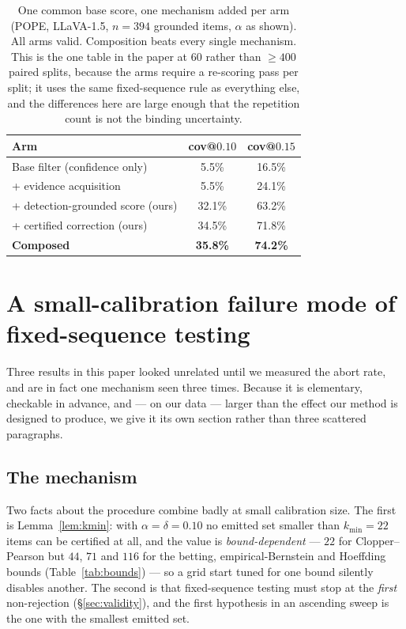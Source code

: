 \documentclass[review,number,doubleblind]{elsarticle}
\theoremstyle{plain}
\theoremstyle{definition}
\theoremstyle{remark}
\begin{document}
\begin{table}[t]
\centering
\caption{One common base score, one mechanism added per arm (POPE, LLaVA-1.5, $n=394$
grounded items, $\alpha$ as shown). All arms valid. Composition beats every single mechanism.
This is the one table in the paper at $60$ rather than $\ge400$ paired splits, because the arms
require a re-scoring pass per split; it uses the same fixed-sequence rule as everything else, and
the differences here are large enough that the repetition count is not the binding uncertainty.}
\label{tab:bcea}
\begin{tabular}{lcc}
\toprule
Arm & cov@$0.10$ & cov@$0.15$\\
\midrule
Base filter (confidence only)              & 5.5\%  & 16.5\%\\
\quad + evidence acquisition \citep{bcea}  & 5.5\%  & 24.1\%\\
\quad + detection-grounded score (ours)    & 32.1\% & 63.2\%\\
\quad + certified correction (ours)        & 34.5\% & 71.8\%\\
\textbf{Composed}                          & \textbf{35.8\%} & \textbf{74.2\%}\\
\bottomrule
\end{tabular}
\end{table}

\section{A small-calibration failure mode of fixed-sequence testing}
\label{sec:kminfail}

Three results in this paper looked unrelated until we measured the abort rate, and are in fact
one mechanism seen three times. Because it is elementary, checkable in advance, and --- on our
data --- larger than the effect our method is designed to produce, we give it its own section
rather than three scattered paragraphs.

\subsection{The mechanism}

Two facts about the procedure combine badly at small calibration size. The first is
Lemma~\ref{lem:kmin}: with $\alpha=\delta=0.10$ no emitted set smaller than $k_{\min}=22$ items
can be certified at all, and the value is \emph{bound-dependent} --- $22$ for Clopper--Pearson but
$44$, $71$ and $116$ for the betting, empirical-Bernstein and Hoeffding bounds
(Table~\ref{tab:bounds}) --- so a grid start tuned for one bound silently disables another. The
second is that fixed-sequence testing must stop at the \emph{first} non-rejection
(\S\ref{sec:validity}), and the first hypothesis in an ascending sweep is the one with the
smallest emitted set.
\end{document}
